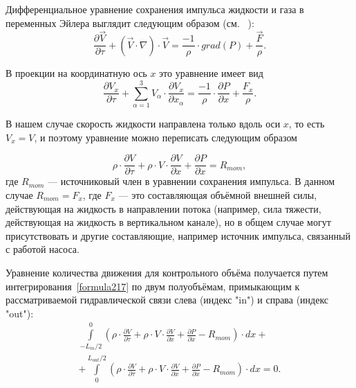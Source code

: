 
\label{sec:subsection22}
Дифференциальное уравнение сохранения импульса жидкости и газа в переменных Эйлера выглядит следующим образом (см. ~\cite{Samarsky}):
\begin{equation}
\label{formula215}
\frac{\partial\vec V}{\partial\tau}+(\vec{V} \cdot \nabla)\cdot \vec{V} = \frac{-1}{\rho} \cdot grad(P) + \frac{\vec{F}}{\rho}. 
\end{equation}

В проекции на координатную ось $x$ это уравнение имеет вид
\begin{equation}
\label{formula216}
\frac{\partial V_x}{\partial\tau}+\sum_{\alpha=1}^{3} V_{\alpha} \cdot \frac{\partial V_x}{\partial x_{\alpha}} = \frac{-1}{\rho} \cdot \frac{\partial P}{\partial x} + \frac{F_x}{\rho}. 
\end{equation}

В нашем случае скорость жидкости направлена только вдоль оси $x$, то есть $V_x=V$, и поэтому уравнение можно переписать следующим образом

\begin{equation}
\label{formula217}
\rho\cdot\frac{\partial V}{\partial\tau}+\rho\cdot V \cdot \frac{\partial V}{\partial x} + \frac{\partial P}{\partial x} = R_{mom}, 
\end{equation}
где $R_{mom}$ --- источниковый член в уравнении сохранения импульса. В данном случае $R_{mom} = F_x$, где $F_x$ --- это составляющая объёмной внешней силы, действующая на жидкость в направлении потока (например, сила тяжести, действующая на жидкость в вертикальном канале), но в общем случае могут присутствовать и другие составляющие, например источник импульса, связанный с работой насоса.

Уравнение количества движения для контрольного объёма получается путем интегрирования~\eqref{formula217} по двум полуобъёмам, примыкающим к рассматриваемой гидравлической связи слева (индекс "in") и справа (индекс "out"):
\begin{eqnarray}
\label{formula218}
\int\limits_{-L_{in}/2}^{0} \left(\rho\cdot\frac{\partial V}{\partial\tau}+\rho\cdot V \cdot \frac{\partial V}{\partial x}+\frac{\partial P}{\partial x}-R_{mom}\right) \cdot dx + \nonumber ~\\
+ \int\limits_{0}^{L_{out}/2} \left(\rho\cdot\frac{\partial V}{\partial\tau}+\rho\cdot V \cdot \frac{\partial V}{\partial x}+\frac{\partial P}{\partial x}-R_{mom}\right) \cdot dx = 0.
\end{eqnarray}

